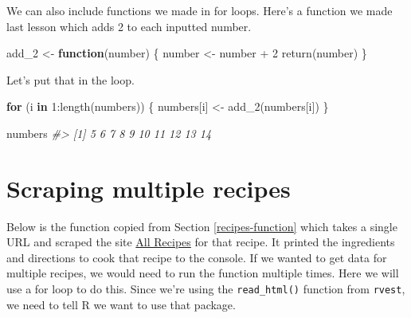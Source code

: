 \documentclass[
  12pt,
]{book}
\newenvironment{Shaded}{\begin{snugshade}}{\end{snugshade}}
\newcommand{\CommentTok}[1]{\textcolor[rgb]{0.37,0.37,0.37}{\textit{#1}}}
\newcommand{\ControlFlowTok}[1]{\textcolor[rgb]{0.27,0.27,0.27}{\textbf{#1}}}
\newcommand{\DecValTok}[1]{\textcolor[rgb]{0.06,0.06,0.06}{#1}}
\newcommand{\FunctionTok}[1]{\textcolor[rgb]{0,0,0}{#1}}
\newcommand{\NormalTok}[1]{#1}
\newcommand{\OtherTok}[1]{\textcolor[rgb]{0.37,0.37,0.37}{#1}}
\newcommand{\SpecialCharTok}[1]{\textcolor[rgb]{0,0,0}{#1}}
\begin{document}
We can also include functions we made in for loops. Here's a function we made last lesson which adds 2 to each inputted number.

\begin{Shaded}
\begin{Highlighting}[]
\NormalTok{add\_2 }\OtherTok{\textless{}{-}} \ControlFlowTok{function}\NormalTok{(number) \{}
\NormalTok{  number }\OtherTok{\textless{}{-}}\NormalTok{ number }\SpecialCharTok{+} \DecValTok{2}
  \FunctionTok{return}\NormalTok{(number)}
\NormalTok{\}}
\end{Highlighting}
\end{Shaded}

Let's put that in the loop.

\begin{Shaded}
\begin{Highlighting}[]
\ControlFlowTok{for}\NormalTok{ (i }\ControlFlowTok{in} \DecValTok{1}\SpecialCharTok{:}\FunctionTok{length}\NormalTok{(numbers)) \{}
\NormalTok{  numbers[i] }\OtherTok{\textless{}{-}} \FunctionTok{add\_2}\NormalTok{(numbers[i])}
\NormalTok{\}}
\end{Highlighting}
\end{Shaded}

\begin{Shaded}
\begin{Highlighting}[]
\NormalTok{numbers}
\CommentTok{\#\textgreater{}  [1]  5  6  7  8  9 10 11 12 13 14}
\end{Highlighting}
\end{Shaded}

\hypertarget{scraping-multiple-recipes}{%
\section{Scraping multiple recipes}\label{scraping-multiple-recipes}}

Below is the function copied from Section \ref{recipes-function} which takes a single URL and scraped the site \href{https://www.allrecipes.com/}{All Recipes} for that recipe. It printed the ingredients and directions to cook that recipe to the console. If we wanted to get data for multiple recipes, we would need to run the function multiple times. Here we will use a for loop to do this. Since we're using the \texttt{read\_html()} function from \texttt{rvest}, we need to tell R we want to use that package.
\end{document}
